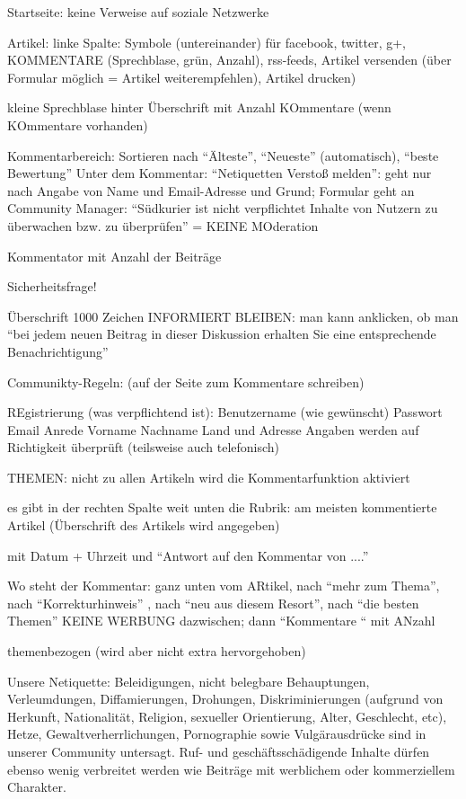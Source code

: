 Startseite: keine Verweise auf soziale Netzwerke

Artikel:
linke Spalte: Symbole (untereinander) für facebook, twitter, g+, KOMMENTARE (Sprechblase, grün, Anzahl), rss-feeds, Artikel versenden (über Formular möglich = Artikel weiterempfehlen), Artikel drucken)

kleine Sprechblase hinter Überschrift mit Anzahl KOmmentare (wenn KOmmentare vorhanden)

Kommentarbereich:
Sortieren nach ``Älteste'', ``Neueste'' (automatisch), ``beste Bewertung''
Unter dem Kommentar: 
``Netiquetten Verstoß melden'': geht nur nach Angabe von Name und Email-Adresse und Grund; Formular geht an Community Manager: ``Südkurier ist nicht verpflichtet Inhalte von Nutzern zu überwachen bzw. zu überprüfen'' = KEINE MOderation

Kommentator mit Anzahl der Beiträge

Sicherheitsfrage!

Überschrift
1000 Zeichen
INFORMIERT BLEIBEN: man kann anklicken, ob man ``bei jedem neuen Beitrag in dieser Diskussion erhalten Sie eine entsprechende Benachrichtigung''

Communikty-Regeln: (auf der Seite zum Kommentare schreiben)

REgistrierung (was verpflichtend ist): 
Benutzername (wie gewünscht)
Passwort
Email
Anrede
Vorname
Nachname
Land und Adresse
Angaben werden auf Richtigkeit überprüft (teilsweise auch telefonisch)

THEMEN: nicht zu allen Artikeln wird die Kommentarfunktion aktiviert

es gibt in der rechten Spalte weit unten die Rubrik: am meisten kommentierte Artikel (Überschrift des Artikels wird angegeben)

mit Datum + Uhrzeit und   ``Antwort auf den Kommentar von ....''

Wo steht der Kommentar:
ganz unten vom ARtikel, nach ``mehr zum Thema'', nach ``Korrekturhinweis'' , nach ``neu aus diesem Resort'', nach ``die besten Themen'' KEINE WERBUNG dazwischen; dann ``Kommentare `` mit ANzahl 

themenbezogen (wird aber nicht extra hervorgehoben)

Unsere Netiquette:
Beleidigungen, nicht belegbare Behauptungen, Verleumdungen, Diffamierungen, Drohungen, Diskriminierungen (aufgrund von Herkunft, Nationalität, Religion, sexueller Orientierung, Alter, Geschlecht, etc), Hetze, Gewaltverherrlichungen, Pornographie sowie Vulgärausdrücke sind in unserer Community untersagt.
Ruf- und geschäftsschädigende Inhalte dürfen ebenso wenig verbreitet werden wie Beiträge mit werblichem oder kommerziellem Charakter.

